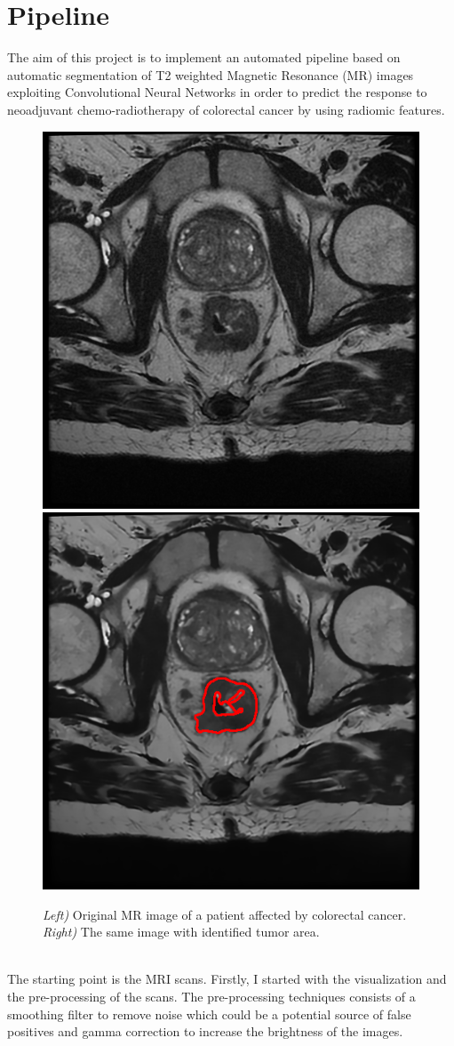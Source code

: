 \documentclass{standalone}
\begin{document}
\chapter{Pipeline}
The aim of this project is to implement an automated pipeline based on automatic segmentation of T2 weighted Magnetic Resonance (MR) images exploiting Convolutional Neural Networks in order to predict the response to neoadjuvant chemo-radiotherapy of colorectal cancer by using radiomic features.
\begin{figure}[htp]

    \centering
    \includegraphics[width=.49\textwidth]{../images/11.png}
    \includegraphics[width=.49\textwidth]{../images/11_cont.png}
    
    \caption{ \textit{ Left)} Original MR image of a patient affected by colorectal cancer.\textit{ Right)} The same image with identified tumor area.}
    \label{comparison}
    
    \end{figure}
    \\
The starting point is the MRI scans. 
Firstly, I started with the visualization and the pre-processing of the scans.
The pre-processing techniques consists of a smoothing filter to remove noise which could be a potential source of false positives and gamma correction to increase the brightness of the images.
\end{document}
